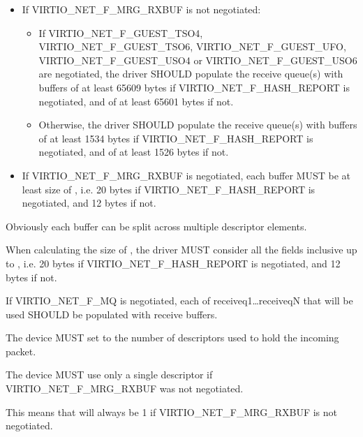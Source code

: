\begin{itemize}
\item If VIRTIO_NET_F_MRG_RXBUF is not negotiated:
  \begin{itemize}
    \item If VIRTIO_NET_F_GUEST_TSO4, VIRTIO_NET_F_GUEST_TSO6, VIRTIO_NET_F_GUEST_UFO,
	VIRTIO_NET_F_GUEST_USO4 or VIRTIO_NET_F_GUEST_USO6 are negotiated, the driver SHOULD populate
      the receive queue(s) with buffers of at least 65609 bytes if
      VIRTIO_NET_F_HASH_REPORT is negotiated, and of at least 65601 bytes if not.
    \item Otherwise, the driver SHOULD populate the receive queue(s)
      with buffers of at least 1534 bytes if VIRTIO_NET_F_HASH_REPORT
      is negotiated, and of at least 1526 bytes if not.
  \end{itemize}
\item If VIRTIO_NET_F_MRG_RXBUF is negotiated, each buffer MUST be at
least size of ,
i.e. 20 bytes if VIRTIO_NET_F_HASH_REPORT is negotiated, and 12 bytes if not.
\end{itemize}

\begin{note}
Obviously each buffer can be split across multiple descriptor elements.
\end{note}

When calculating the size of , the driver
MUST consider all the fields inclusive up to ,
i.e. 20 bytes if VIRTIO_NET_F_HASH_REPORT is negotiated, and 12 bytes if not.

If VIRTIO_NET_F_MQ is negotiated, each of receiveq1\ldots receiveqN
that will be used SHOULD be populated with receive buffers.


The device MUST set  to the number of descriptors used to
hold the incoming packet.

The device MUST use only a single descriptor if VIRTIO_NET_F_MRG_RXBUF
was not negotiated.
\begin{note}
{This means that  will always be 1
if VIRTIO_NET_F_MRG_RXBUF is not negotiated.}
\end{note}

